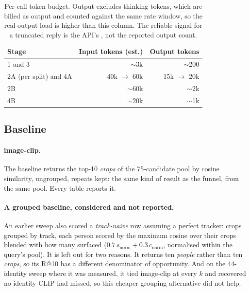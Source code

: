 \begin{table}[H]
\centering
\begin{tabular}{@{}lrr@{}}
\toprule
\textbf{Stage} & \textbf{Input tokens (est.)} & \textbf{Output tokens}\\
\midrule
1 and 3                  & $\sim$3k          & $\sim$200\\
2A (per split) and 4A    & 40k $\rightarrow$ 60k & 15k $\rightarrow$ 20k\\
2B                       & $\sim$60k         & $\sim$2k\\
4B                       & $\sim$20k         & $\sim$1k\\
\bottomrule
\end{tabular}
\caption[Per-call token budget]{Per-call token budget. Output excludes thinking tokens, which are billed
as output and counted against the same rate window, so the real output load is
higher than this column. The reliable signal for a truncated reply is the API's
, not the reported output count.}
\label{tab:r-tokens}
\end{table}

\subsection{Baseline}
\paragraph{image-clip.} The baseline returns the top-10 \emph{crops} of the
75-candidate pool by cosine similarity, ungrouped, repeats kept: the same kind of
result as the funnel, from the same pool. Every table reports it.

\paragraph{A grouped baseline, considered and not reported.} An earlier sweep also
scored a \emph{track-naive} row assuming a perfect tracker: crops grouped by track,
each person scored by the maximum cosine over their crops blended with how many
surfaced ($0.7\,s_{\text{norm}} + 0.3\,c_{\text{norm}}$, normalised within the
query's pool). It is left out for two reasons. It returns ten \emph{people} rather
than ten \emph{crops}, so its R@10 has a different denominator of opportunity. And
on the 44-identity sweep where it was measured, it tied image-clip at every $k$ and
recovered no identity CLIP had missed, so this cheaper grouping alternative did not
help.

